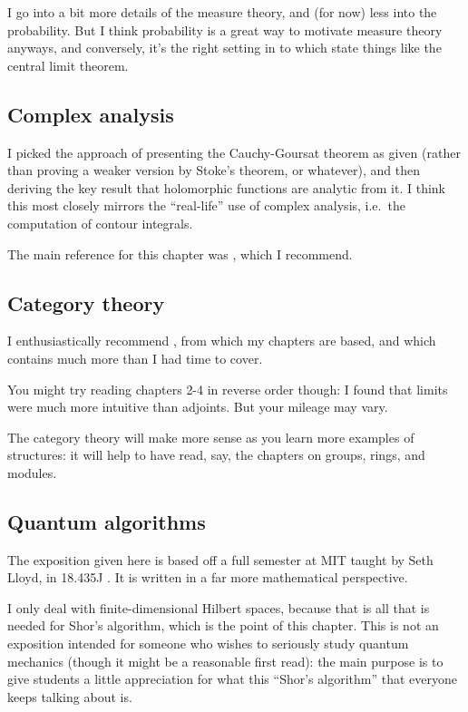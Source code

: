 I go into a bit more details of the measure theory,
and (for now) less into the probability.
But I think probability is a great way to motivate measure theory anyways,
and conversely, it's the right setting in to which state things like
the central limit theorem.

\subsection{Complex analysis}
I picked the approach of presenting the Cauchy-Goursat theorem as given
(rather than proving a weaker version by Stoke's theorem, or whatever),
and then deriving the key result that holomorphic functions are analytic
from it.
I think this most closely mirrors the ``real-life'' use of complex
analysis, i.e.\ the computation of contour integrals.

The main reference for this chapter was \cite{ref:dartmouth}, which I recommend.

\subsection{Category theory}
I enthusiastically recommend \cite{ref:msci},
from which my chapters are based,
and which contains much more than I had time to cover.

You might try reading chapters {2-4} in reverse order though:
I found that limits were much more intuitive than adjoints.
But your mileage may vary.

The category theory will make more sense as you learn
more examples of structures: it will help to have read,
say, the chapters on groups, rings, and modules.

\subsection{Quantum algorithms}
The exposition given here is based off a full semester
at MIT taught by Seth Lloyd, in 18.435J \cite{ref:18-435}.
It is written in a far more mathematical perspective.

I only deal with finite-dimensional Hilbert spaces,
because that is all that is needed for Shor's algorithm,
which is the point of this chapter.
This is not an exposition intended for someone who wishes to seriously
study quantum mechanics (though it might be a reasonable first read):
the main purpose is to give students a little appreciation for
what this ``Shor's algorithm'' that everyone keeps talking about is.

